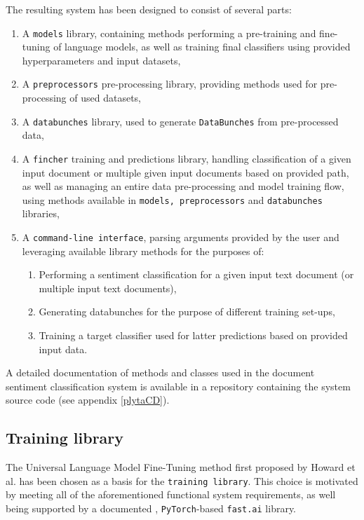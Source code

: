 The resulting system has been designed to consist of several parts:
\begin{enumerate}
    \item A \lstinline{models} library, containing methods performing a pre-training and fine-tuning of language models, as well as training final classifiers using provided hyperparameters and input datasets,
    \item A \lstinline{preprocessors} pre-processing library, providing methods used for pre-processing of used datasets,
    \item A \lstinline{databunches} library, used to generate \lstinline{DataBunches} from pre-processed data,
    \item A \lstinline{fincher} training and predictions library, handling classification of a given input document or multiple given input documents based on provided path, as well as managing an entire data pre-processing and model training flow, using methods available in \lstinline{models, preprocessors} and \lstinline{databunches} libraries,
    \item A \lstinline{command-line interface}, parsing arguments provided by the user and leveraging available library methods for the purposes of: \begin{enumerate}
        \item Performing a sentiment classification for a given input text document (or multiple input text documents),
        \item Generating databunches for the purpose of different training set-ups,
        \item Training a target classifier used for latter predictions based on provided input data.
    \end{enumerate}
\end{enumerate}

A detailed documentation of methods and classes used in the document sentiment classification system is available in a repository containing the system source code (see appendix \ref{plytaCD}).

\subsection{Training library}

The Universal Language Model Fine-Tuning method first proposed by Howard et al. \cite{ulmfit} has been chosen as a basis for the \lstinline{training library}. This choice is motivated by meeting all of the aforementioned functional system requirements, as well being supported by a documented \cite{fastai:docs}, \lstinline{PyTorch}-based \lstinline{fast.ai} library.

